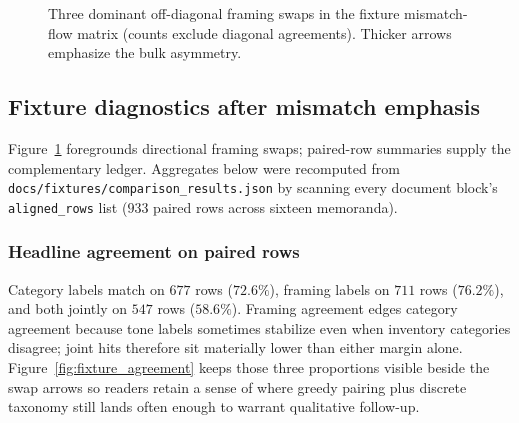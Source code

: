 \documentclass[11pt,a4paper]{article}
\theoremstyle{remark}
\begin{document}
\begin{figure}[htbp]
\centering
{}
\caption{Three dominant off-diagonal framing swaps in the fixture mismatch-flow matrix (counts exclude diagonal agreements). Thicker arrows emphasize the bulk asymmetry.}
\label{fig:mismatch_top}
\end{figure}

\subsection{Fixture diagnostics after mismatch emphasis}
\label{sec:fixture_balance}

Figure~\ref{fig:mismatch_top} foregrounds directional framing swaps; paired-row summaries supply the complementary ledger. Aggregates below were recomputed from \texttt{docs/fixtures/comparison\_results.json} by scanning every document block's \texttt{aligned\_rows} list ($933$ paired rows across sixteen memoranda).

\subsubsection{Headline agreement on paired rows}
Category labels match on $677$ rows ($72.6\%$), framing labels on $711$ rows ($76.2\%$), and both jointly on $547$ rows ($58.6\%$). Framing agreement edges category agreement because tone labels sometimes stabilize even when inventory categories disagree; joint hits therefore sit materially lower than either margin alone. Figure~\ref{fig:fixture_agreement} keeps those three proportions visible beside the swap arrows so readers retain a sense of where greedy pairing plus discrete taxonomy still lands often enough to warrant qualitative follow-up.
\end{document}
